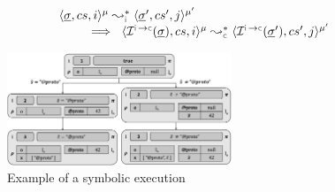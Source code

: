 \begin{lemma}\label{lemma:instrumented:semantics}
$$
\begin{array}{l}
\transabssemrule{\istate, \cs, i}{\istate', \cs', j}{\mode}{\mode'}{\instrumented}  \\ \quad \quad
       \ \implies \ 
        \transabssemrule{\interpret{\instconc}{}(\istate), \cs, i}{\interpret{\instconc}{}(\istate'), \cs', j}{\mode}{\mode'}{\concrete} 
\end{array}
$$
\end{lemma}



%


\begin{figure}[!t]
\centering
\includegraphics[width=0.6\textwidth]{figures/symbSemEx.png}
\vspace*{-0.1cm}
\caption{Example of a \cosette symbolic execution}
\label{fig:sexecexample}
\vspace*{-0.3cm}
\end{figure}


